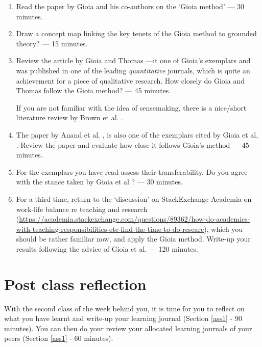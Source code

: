 \documentclass[]{book}
\theoremstyle{definition}
\theoremstyle{definition}
\theoremstyle{definition}
\theoremstyle{remark}
\begin{document}
\begin{enumerate}
\def\labelenumi{\arabic{enumi}.}
\item
  Read the paper by Gioia and his co-authors on the `Gioia method'
  \autocite{gioia_2013_seekingqualitativerigor} --- 30 minutes.
\item
  Draw a concept map linking the key tenets of the Gioia method to
  grounded theory? --- 15 minutes.
\item
  Review the article by Gioia and Thomas
  \autocite*{gioia_1996_identityimageissuea}---it one of Gioia's
  exemplars and was published in one of the leading \emph{quantitative}
  journals, which is quite an achievement for a piece of qualitative
  research. How closely do Gioia and Thomas follow the Gioia method? ---
  45 minutes.

  If you are not familiar with the idea of sensemaking, there is a
  nice/short literature review by Brown et al.
  \autocite{brown_2015_makingsensesensemaking}.
\item
  The paper by Anand et al.
  \autocite{anand_2007_knowledgebasedinnovationemergence}, is also one
  of the exemplars cited by Gioia et al,
  \autocite*{gioia_2013_seekingqualitativerigor}. Review the paper and
  evaluate how close it follows Gioia's method --- 45 minutes.
\item
  For the exemplars you have read assess their transferability. Do you
  agree with the stance taken by Gioia et al
  \autocite*{gioia_2013_seekingqualitativerigor}? --- 30 minutes.
\item
  For a third time, return to the `discussion' on StackExchange Academia
  on work-life balance re teaching and research
  (\url{https://academia.stackexchange.com/questions/89362/how-do-academics-with-teaching-responsibilities-etc-find-the-time-to-do-researc}),
  which you should be rather familiar now, and apply the Gioia method.
  Write-up your results following the advice of Gioia et al.
  \autocite*{gioia_2013_seekingqualitativerigor} --- 120 minutes.
\end{enumerate}

\hypertarget{post-class-reflection-9}{%
\section*{Post class reflection}\label{post-class-reflection-9}}

With the second class of the week behind you, it is time for you to
reflect on what you have learnt and write-up your learning journal
(Section \ref{ass1} ‐ 90 minutes). You can then do your review your
allocated learning journals of your peers (Section \ref{ass1} ‐ 60
minutes).
\end{document}
